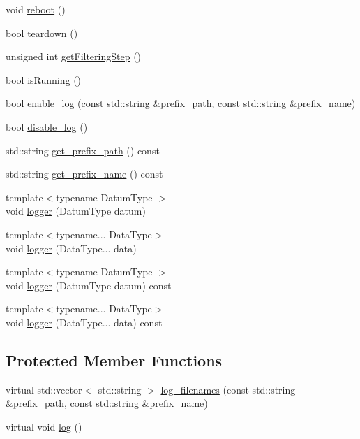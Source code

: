 \begin{DoxyCompactItemize}
\item 
void \mbox{\hyperlink{classbfl_1_1FilteringAlgorithm_a6022859aa985474fb997343cc935b11e}{reboot}} ()
\item 
bool \mbox{\hyperlink{classbfl_1_1FilteringAlgorithm_a1dc912d89ee8f96d4f3e8209865c5308}{teardown}} ()
\item 
unsigned int \mbox{\hyperlink{classbfl_1_1FilteringAlgorithm_a8c43b1f3dac30934c0a03de348d4a29d}{get\+Filtering\+Step}} ()
\item 
bool \mbox{\hyperlink{classbfl_1_1FilteringAlgorithm_a5cfecab2c778620e2557237472bb1721}{is\+Running}} ()
\item 
bool \mbox{\hyperlink{classbfl_1_1Logger_ae94b97b6e8d7902e8ce048384813122e}{enable\+\_\+log}} (const std\+::string \&prefix\+\_\+path, const std\+::string \&prefix\+\_\+name)
\item 
bool \mbox{\hyperlink{classbfl_1_1Logger_a440467a28ccc46490d767fe0ef6f556a}{disable\+\_\+log}} ()
\item 
std\+::string \mbox{\hyperlink{classbfl_1_1Logger_a56cf1a4e712bf23d9978420a8a59a62b}{get\+\_\+prefix\+\_\+path}} () const
\item 
std\+::string \mbox{\hyperlink{classbfl_1_1Logger_a913a795b7bfbf378815eeb342d68a7c0}{get\+\_\+prefix\+\_\+name}} () const
\item 
{\footnotesize template$<$typename Datum\+Type $>$ }\\void \mbox{\hyperlink{classbfl_1_1Logger_a1033ff31398484f2132f84fd140da9e3}{logger}} (Datum\+Type datum)
\item 
{\footnotesize template$<$typename... Data\+Type$>$ }\\void \mbox{\hyperlink{classbfl_1_1Logger_aca2086c9256e5c404872b91f7f25b97d}{logger}} (Data\+Type... data)
\item 
{\footnotesize template$<$typename Datum\+Type $>$ }\\void \mbox{\hyperlink{classbfl_1_1Logger_a50b1c109730fa98f66e66f420f0158fe}{logger}} (Datum\+Type datum) const
\item 
{\footnotesize template$<$typename... Data\+Type$>$ }\\void \mbox{\hyperlink{classbfl_1_1Logger_a0f0cf7ce956546d94dfb1feb7cebf171}{logger}} (Data\+Type... data) const
\end{DoxyCompactItemize}
\subsection*{Protected Member Functions}
\begin{DoxyCompactItemize}
\item 
virtual std\+::vector$<$ std\+::string $>$ \mbox{\hyperlink{classbfl_1_1Logger_a328ceaa8e70e6918f11142b12b8be217}{log\+\_\+filenames}} (const std\+::string \&prefix\+\_\+path, const std\+::string \&prefix\+\_\+name)
\item 
virtual void \mbox{\hyperlink{classbfl_1_1Logger_ad44f46593cb8c4c87c1178eb326e2f64}{log}} ()
\end{DoxyCompactItemize}
